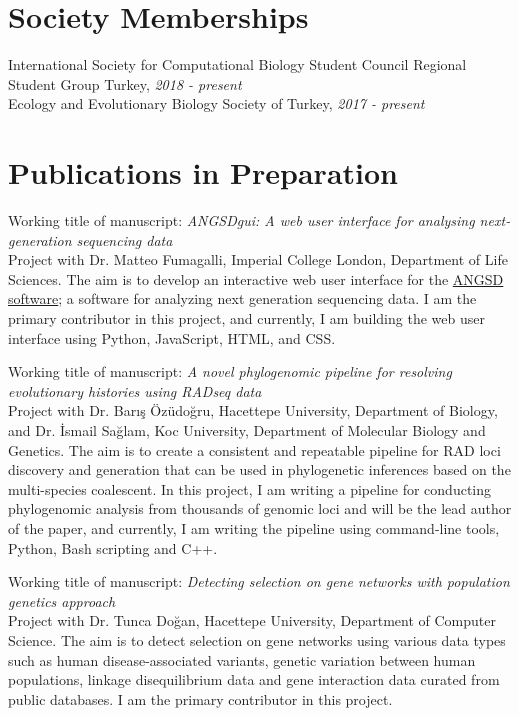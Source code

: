 \documentclass[letterpaper,11pt]{article}
\begin{document}
\section{Society Memberships}	
International Society for Computational Biology Student Council Regional Student Group Turkey, \textit{2018 - present} \\
Ecology and Evolutionary Biology Society of Turkey, \textit{2017 - present} \\



\section{Publications in Preparation}

Working title of manuscript: \textit{ANGSDgui: A web user interface for analysing next‐generation sequencing data}\\
Project with Dr. Matteo Fumagalli, Imperial College London, Department of Life Sciences. The aim is to develop an interactive web user interface for the \href{http://www.popgen.dk/angsd/index.php/ANGSD}{ANGSD software}; a software for analyzing next generation sequencing data. I am the primary contributor in this project, and currently, I am building the web user interface using Python, JavaScript, HTML, and CSS.
\medskip

Working title of manuscript: \textit{A novel phylogenomic pipeline for resolving evolutionary histories using RADseq data} \\
Project with Dr. Bar{\i}\c{s} \"{O}z\"{u}do\u{g}ru, Hacettepe University, Department of Biology, and Dr. \.{I}smail Sa\u{g}lam, Koc University, Department of Molecular Biology and Genetics. The aim is to create a consistent and repeatable pipeline for RAD loci discovery and generation that can be used in phylogenetic inferences based on the multi-species coalescent. In this project, I am writing a pipeline for conducting phylogenomic analysis from thousands of genomic loci and will be the lead author of the paper, and currently, I am writing the pipeline using command-line tools, Python, Bash scripting and C++.
\medskip

Working title of manuscript: \textit{Detecting selection on gene networks with population genetics approach} \\
Project with Dr. Tunca Do\u{g}an, Hacettepe University, Department of Computer Science. The aim is to detect selection on gene networks using various data types such as human disease-associated variants, genetic variation between human populations, linkage disequilibrium data and gene interaction data curated from public databases. I am the primary contributor in this project.
\medskip
\end{document}
